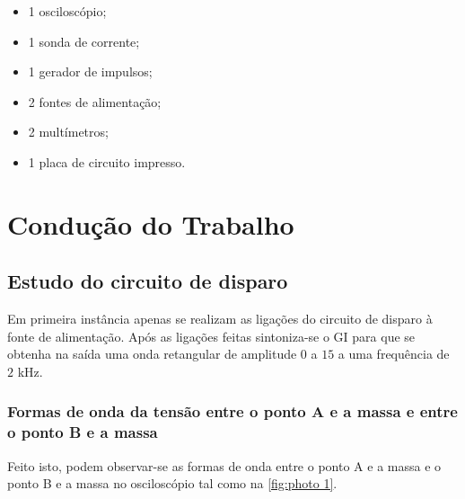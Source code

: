 \documentclass[a4paper,11pt]{article}
\numberwithin{equation}{section}
\begin{document}
\begin{itemize}
	\item 1 osciloscópio;
	\vspace{-2mm}	
	\item 1 sonda de corrente;
	\vspace{-2mm}	
	\item 1 gerador de impulsos;
	\vspace{-2mm}	
	\item 2 fontes de alimentação;
	\vspace{-2mm}	
	\item 2 multímetros;
	\vspace{-2mm}	
	\item 1 placa de circuito impresso.
\end{itemize}

\pagebreak

\section{Condução do Trabalho}

\subsection{Estudo do circuito de disparo}

Em primeira instância apenas se realizam as ligações do circuito de disparo à fonte de alimentação. Após as ligações feitas sintoniza-se o GI para que se obtenha na saída uma onda retangular de amplitude $0$ a $15$ a uma frequência de $2$ kHz.

\subsubsection{Formas de onda da tensão entre o ponto A e a massa e entre o ponto B e a massa}

Feito isto, podem observar-se as formas de onda entre o ponto A e a massa e o ponto B e a massa no osciloscópio tal como na \autoref{fig:photo 1}.
\end{document}
